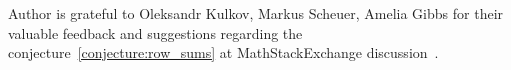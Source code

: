 Author is grateful to Oleksandr Kulkov, Markus Scheuer, Amelia Gibbs for their valuable feedback and suggestions
regarding the conjecture~\eqref{conjecture:row_sums} at MathStackExchange discussion~\cite{kolosov2024_mse_iterated}.
